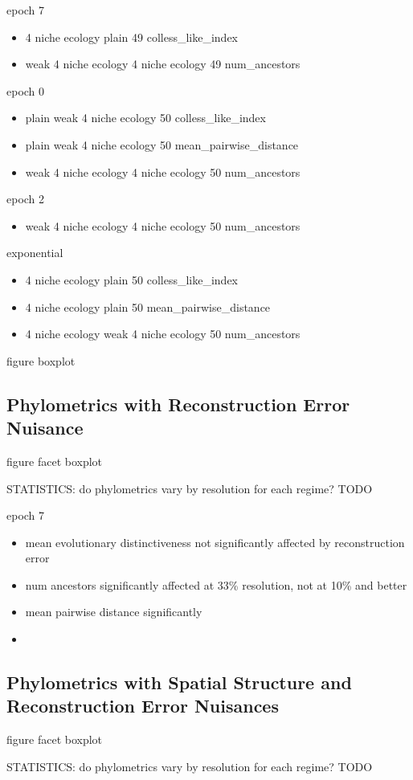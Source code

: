 epoch 7
\begin{itemize}
    \item 4 niche ecology	plain	49	colless_like_index
\item weak 4 niche ecology	4 niche ecology	49	num_ancestors
\end{itemize}

epoch 0
\begin{itemize}

\item plain	weak 4 niche ecology	50	colless_like_index
\item plain	weak 4 niche ecology	50	mean_pairwise_distance
\item weak 4 niche ecology	4 niche ecology	50	num_ancestors

\end{itemize}

epoch 2
\begin{itemize}
    \item weak 4 niche ecology	4 niche ecology	50	num_ancestors
\end{itemize}

exponential
\begin{itemize}
    \item 4 niche ecology	plain	50	colless_like_index
    \item 4 niche ecology	plain	50	mean_pairwise_distance
    \item 4 niche ecology	weak 4 niche ecology	50	num_ancestors
\end{itemize}

figure boxplot


\subsection{Phylometrics with Reconstruction Error Nuisance}



figure facet boxplot

STATISTICS: do phylometrics vary by resolution for each regime?
TODO

epoch 7
\begin{itemize}
    \item mean evolutionary distinctiveness not significantly affected by reconstruction error
    \item num ancestors significantly affected at 33\% resolution, not at 10\% and better
    \item mean pairwise distance significantly 
    \item 
\end{itemize}

\subsection{Phylometrics with Spatial Structure and Reconstruction Error Nuisances}

figure facet boxplot


STATISTICS: do phylometrics vary by resolution for each regime?
TODO